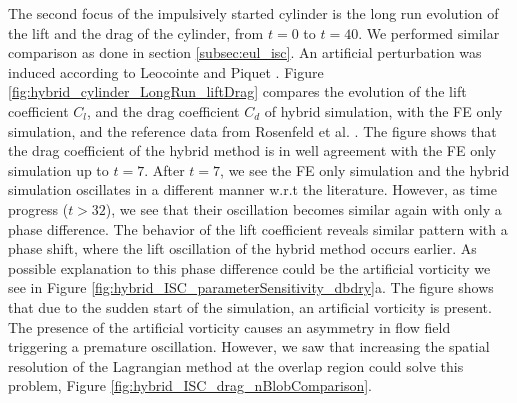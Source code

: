 The second focus of the impulsively started cylinder is the long run evolution of the lift and the drag of the cylinder, from $t=0$ to $t=40$. We performed similar comparison as done in section \ref{subsec:eul_isc}. An artificial perturbation was induced according to Leocointe and Piquet \cite{Lecointe1984}. Figure \ref{fig:hybrid_cylinder_LongRun_liftDrag} compares the evolution of the lift coefficient $C_l$, and the drag coefficient $C_d$ of hybrid simulation, with the FE only simulation, and the reference data from Rosenfeld et al. \cite{MosheRosenFeldDochanKwak1991}. The figure shows that the drag coefficient of the hybrid method is in well agreement with the FE only simulation up to $t=7$. After $t=7$, we see the FE only simulation and the hybrid simulation oscillates in a different manner w.r.t the literature. However, as time progress ($t>32$), we see that their oscillation becomes similar again with only a phase difference. The behavior of the lift coefficient reveals similar pattern with a phase shift, where the lift oscillation of the hybrid method occurs earlier. As possible explanation to this phase difference could be the artificial vorticity we see in Figure \ref{fig:hybrid_ISC_parameterSensitivity_dbdry}a. The figure shows that due to the sudden start of the simulation, an artificial vorticity is present. The presence of the artificial vorticity causes an asymmetry in flow field triggering a premature oscillation. However, we saw that increasing the spatial resolution of the Lagrangian method at the overlap region could solve this problem, Figure \ref{fig:hybrid_ISC_drag_nBlobComparison}.



